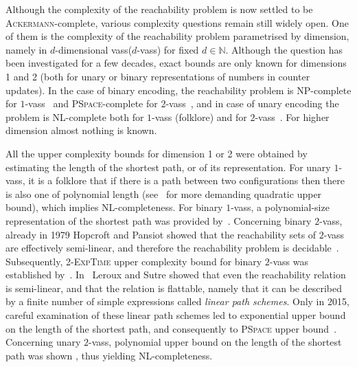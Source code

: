 \documentclass[a4paper, UKenglish, cleveref, autoref, thm-restate]{lipics-v2021}
\newcommand{\N}{\mathbb{N}}
\newcommand{\nl}{\textsc{NL}\xspace}
\newcommand{\np}{\textsc{NP}\xspace}
\newcommand{\pspace}{\textsc{PSpace}\xspace}
\newcommand{\twoexptime}{\textsc{2-ExpTime}\xspace}
\newcommand{\ackermann}{\textsc{Ackermann}\xspace}
\newcommand{\vass}{{\sc vass}\xspace}
\newcommand{\dvass}{\parvass 2}
\newcommand{\parvass}[1]{{$#1$-\vass}\xspace}
\begin{document}
Although the complexity of the reachability problem is now settled to be \ackermann-complete, 
various complexity questions remain still widely open.
One of them is the complexity of the reachability problem parametrised by dimension, namely in
$d$-dimensional \vass (\parvass d) for fixed $d \in \N$. 
Although the question has been investigated for a few decades, 
exact bounds are only known for dimensions 1 and 2
(both for unary or binary representations of numbers in counter updates).
In the case of binary encoding, the reachability problem is \np-complete
for \parvass 1~\cite{DBLP:conf/concur/HaaseKOW09} and \pspace-complete 
for \dvass~\cite{BlondinFGHM15}, and in case of
unary encoding the problem is \nl-complete both for \parvass 1 (folklore) and for 
\dvass~\cite{DBLP:conf/lics/EnglertLT16}.
For higher dimension almost nothing is  known.

All the upper complexity bounds for dimension 1 or 2 were obtained by estimating
the length of the shortest path, or of its representation.
For unary \parvass 1, it is a folklore that if there is a path between two configurations then there is 
also one of polynomial length (see~\cite{DBLP:journals/lmcs/ChistikovCHPW19} for more demanding 
quadratic upper bound), which implies \nl-completeness.
For binary \parvass 1, a polynomial-size representation of the shortest path was provided
by~\cite{DBLP:conf/concur/HaaseKOW09}.
Concerning binary \dvass,
already in 1979 Hopcroft and Pansiot showed that the reachability sets of \dvass
are effectively semi-linear, and therefore the reachability problem is 
decidable~\cite{DBLP:journals/tcs/HopcroftP79}.
Subsequently, \twoexptime upper complexity bound for binary \dvass
was established by~\cite{DBLP:journals/tcs/HowellRHY86}.
In~\cite{DBLP:conf/concur/LerouxS04} Leroux and Sutre showed that even the reachability relation 
is semi-linear, and that the relation
is flattable, namely that it can be described by a finite number of simple expressions called 
\emph{linear path schemes}.
Only in 2015, careful examination of these linear path schemes led to
exponential upper bound on the length of the shortest path, and 
consequently to \pspace upper bound~\cite{BlondinFGHM15}.
Concerning unary \dvass, polynomial upper bound on the length of the shortest path was shown
\cite{DBLP:conf/lics/EnglertLT16,DBLP:journals/jacm/BlondinEFGHLMT21},
thus yielding \nl-completeness. 
\end{document}
